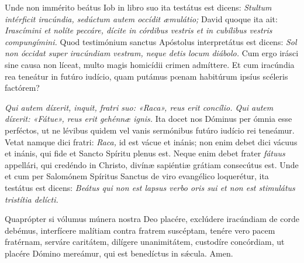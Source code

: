 {{\noindent Unde non immérito beátus Iob in libro suo ita testátus est dicens: \emph{Stultum intérficit iracúndia, sedúctum autem occídit æmulátio;} David quoque ita ait: \emph{Irascímini et nolíte peccáre, dícite in córdibus vestris et in cubílibus vestris compungímini.} Quod testimónium sanctus Apóstolus interpretátus est dicens: \emph{Sol non óccidat super iracúndiam vestram, neque detis locum diábolo.} Cum ergo irásci sine causa non líceat, multo magis homicídii crimen admíttere. Et cum iracúndia rea teneátur in futúro iudício, quam putámus pœnam habitúrum ipsíus scéleris factórem?}

\noindent \emph{Qui autem díxerit, inquit, fratri suo: «Raca», reus erit concílio. Qui autem díxerit: «Fátue», reus erit gehénnæ ignis.} Ita docet nos Dóminus per ómnia esse perféctos, ut ne lévibus quidem vel vanis sermónibus futúro iudício rei teneámur. Vetat namque dici fratri: \emph{Raca,} id est vácue et inánis; non enim debet dici vácuus et inánis, qui fide et Sancto Spíritu plenus est. Neque enim debet frater \emph{fátuus} appellári, qui credéndo in Christo, divínæ sapiéntiæ grátiam consecútus est. Unde et cum per Salomónem Spíritus Sanctus de viro evangélico loquerétur, ita testátus est dicens: \emph{Beátus qui non est lapsus verbo oris sui et non est stimulátus tristítia delícti.}

\noindent Quaprópter si vólumus múnera nostra Deo placére, exclúdere iracúndiam de corde debémus, interfícere malítiam contra fratrem suscéptam, tenére vero pacem fratérnam, serváre caritátem, dilígere unanimitátem, custodíre concórdiam, ut placére Dómino mereámur, qui est benedíctus in sǽcula. Amen.

\vfill
\pagebreak

 

\vspace{-5mm}


\vfill
\pagebreak
}
\newcommand{\hymnuslaudes}{\pars{Hymnus} \scriptura{Alcuinus (\olddag{} 804)}

\cuminitiali{IV}{temporalia/hym-EcceIam.gtex}}
